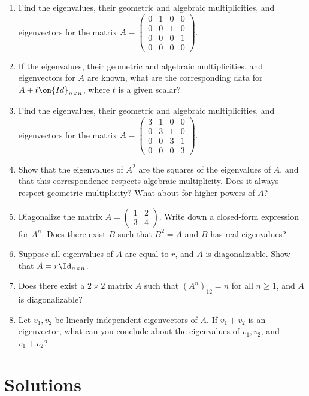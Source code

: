\documentclass[10pt]{amsart}
\theoremstyle{mythm}
\theoremstyle{definition}
\theoremstyle{myrmk}
\begin{document}
	\begin{enumerate}[label=(\arabic*)]
		\item Find the eigenvalues, their geometric and algebraic multiplicities, and eigenvectors for the matrix $A = \begin{pmatrix}
		0 & 1 & 0 & 0 \\
		0 & 0 & 1 & 0 \\
		0 & 0 & 0 & 1 \\
		0 & 0 & 0 & 0
		\end{pmatrix}$. 
		\item If the eigenvalues, their geometric and algebraic multiplicities, and eigenvectors for $A$ are known, what are the corresponding data for $A + t \on{Id}_{n \times n}$, where $t$ is a given scalar? 
		\item Find the eigenvalues, their geometric and algebraic multiplicities, and eigenvectors for the matrix $A = \begin{pmatrix}
		3 & 1 & 0 & 0 \\
		0 & 3 & 1 & 0 \\
		0 & 0 & 3 & 1 \\
		0 & 0 & 0 & 3
		\end{pmatrix}$. 
		\item Show that the eigenvalues of $A^2$ are the squares of the eigenvalues of $A$, and that this correspondence respects algebraic multiplicity. Does it always respect geometric multiplicity? What about for higher powers of $A$? 
		\item Diagonalize the matrix $A = \begin{pmatrix}
		1 & 2 \\ 3 & 4 
		\end{pmatrix}$. Write down a closed-form expression for $A^n$. Does there exist $B$ such that $B^2 = A$ and $B$ has real eigenvalues? 
		\item Suppose all eigenvalues of $A$ are equal to $r$, and $A$ is diagonalizable. Show that $A = r \Id_{n \times n}$. 
		\item Does there exist a $2 \times 2$ matrix $A$ such that $(A^n)_{12} = n$ for all $n \ge 1$, and $A$ is diagonalizable? 
		\item Let $v_1, v_2$ be linearly independent eigenvectors of $A$. If $v_1 + v_2$ is an eigenvector, what can you conclude about the eigenvalues of $v_1, v_2$, and $v_1 + v_2$? 
	\end{enumerate}
	
	\newpage
	
	\section*{Solutions}
	
\end{document}
